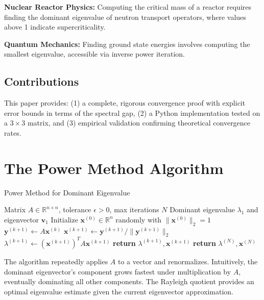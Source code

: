 \documentclass[11pt,a4paper]{article}
\begin{document}
\textbf{Nuclear Reactor Physics:} Computing the critical mass of a reactor requires finding the dominant eigenvalue of neutron transport operators, where values above 1 indicate supercriticality.

\textbf{Quantum Mechanics:} Finding ground state energies involves computing the smallest eigenvalue, accessible via inverse power iteration.

\subsection{Contributions}

This paper provides: (1) a complete, rigorous convergence proof with explicit error bounds in terms of the spectral gap, (2) a Python implementation tested on a $3 \times 3$ matrix, and (3) empirical validation confirming theoretical convergence rates.

\section{The Power Method Algorithm}

\begin{algorithm}[h]
\caption{Power Method for Dominant Eigenvalue}
\label{alg:power}
\begin{algorithmic}[1]
\Require Matrix $A \in \mathbb{R}^{n \times n}$, tolerance $\epsilon > 0$, max iterations $N$
\Ensure Dominant eigenvalue $\lambda_1$ and eigenvector $\mathbf{v}_1$
\State Initialize $\mathbf{x}^{(0)} \in \mathbb{R}^n$ randomly with $\|\mathbf{x}^{(0)}\|_2 = 1$
    \State $\mathbf{y}^{(k+1)} \gets A\mathbf{x}^{(k)}$ 
    \State $\mathbf{x}^{(k+1)} \gets \mathbf{y}^{(k+1)} / \|\mathbf{y}^{(k+1)}\|_2$ 
    \State $\lambda^{(k+1)} \gets (\mathbf{x}^{(k+1)})^T A \mathbf{x}^{(k+1)}$ 
        \State \textbf{return} $\lambda^{(k+1)}, \mathbf{x}^{(k+1)}$
    \EndIf
\EndFor
\State \textbf{return} $\lambda^{(N)}, \mathbf{x}^{(N)}$
\end{algorithmic}
\end{algorithm}

The algorithm repeatedly applies $A$ to a vector and renormalizes. Intuitively, the dominant eigenvector's component grows fastest under multiplication by $A$, eventually dominating all other components. The Rayleigh quotient provides an optimal eigenvalue estimate given the current eigenvector approximation.
\end{document}

